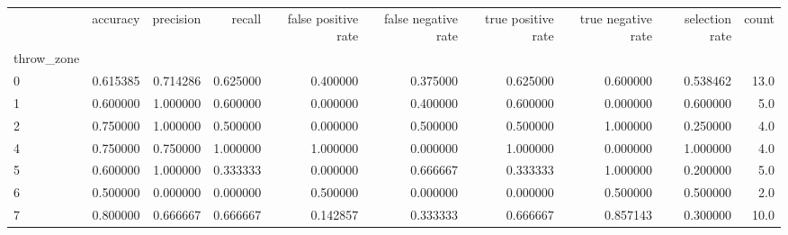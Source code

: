\begin{tabular}{lrrrrrrrrr}
\toprule
{} &  accuracy &  precision &    recall &  false positive rate &  false negative rate &  true positive rate &  true negative rate &  selection rate &  count \\
throw\_zone &           &            &           &                      &                      &                     &                     &                 &        \\
\midrule
0          &  0.615385 &   0.714286 &  0.625000 &             0.400000 &             0.375000 &            0.625000 &            0.600000 &        0.538462 &   13.0 \\
1          &  0.600000 &   1.000000 &  0.600000 &             0.000000 &             0.400000 &            0.600000 &            0.000000 &        0.600000 &    5.0 \\
2          &  0.750000 &   1.000000 &  0.500000 &             0.000000 &             0.500000 &            0.500000 &            1.000000 &        0.250000 &    4.0 \\
4          &  0.750000 &   0.750000 &  1.000000 &             1.000000 &             0.000000 &            1.000000 &            0.000000 &        1.000000 &    4.0 \\
5          &  0.600000 &   1.000000 &  0.333333 &             0.000000 &             0.666667 &            0.333333 &            1.000000 &        0.200000 &    5.0 \\
6          &  0.500000 &   0.000000 &  0.000000 &             0.500000 &             0.000000 &            0.000000 &            0.500000 &        0.500000 &    2.0 \\
7          &  0.800000 &   0.666667 &  0.666667 &             0.142857 &             0.333333 &            0.666667 &            0.857143 &        0.300000 &   10.0 \\
\bottomrule
\end{tabular}
